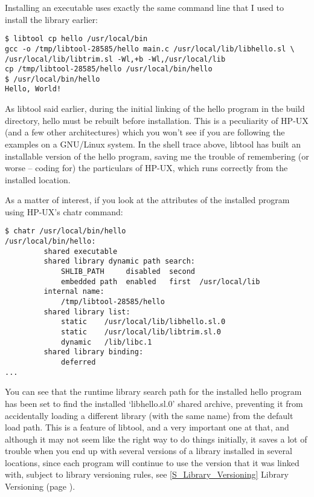 Installing an executable uses exactly the same command line that I used to install the library earlier: 

\begin{Verbatim}
$ libtool cp hello /usr/local/bin
gcc -o /tmp/libtool-28585/hello main.c /usr/local/lib/libhello.sl \
/usr/local/lib/libtrim.sl -Wl,+b -Wl,/usr/local/lib
cp /tmp/libtool-28585/hello /usr/local/bin/hello
$ /usr/local/bin/hello
Hello, World!
\end{Verbatim}

As libtool said earlier, during the initial linking of the hello program in the build directory, hello must be rebuilt before installation. This is a peculiarity of HP-UX (and a few other architectures) which you won't see if you are following the examples on a GNU/Linux system. In the shell trace above, libtool has built an installable version of the hello program, saving me the trouble of remembering (or worse -- coding for) the particulars of HP-UX, which runs correctly from the installed location. 


As a matter of interest, if you look at the attributes of the installed program using HP-UX's chatr command:

\begin{Verbatim}
$ chatr /usr/local/bin/hello
/usr/local/bin/hello: 
         shared executable 
         shared library dynamic path search:
             SHLIB_PATH     disabled  second 
             embedded path  enabled   first  /usr/local/lib
         internal name:
             /tmp/libtool-28585/hello
         shared library list:
             static    /usr/local/lib/libhello.sl.0
             static    /usr/local/lib/libtrim.sl.0
             dynamic   /lib/libc.1
         shared library binding:
             deferred 
...
\end{Verbatim}

You can see that the runtime library search path for the installed hello program has been set to find the installed `libhello.sl.0' shared archive, preventing it from accidentally loading a different library (with the same name) from the default load path. This is a feature of libtool, and a very important one at that, and although it may not seem like the right way to do things initially, it saves a lot of trouble when you end up with several versions of a library installed in several locations, since each program will continue to use the version that it was linked with, subject to library versioning rules, see \ref{S_Library_Versioning} Library Versioning (page \pageref{S_Library_Versioning}). 

